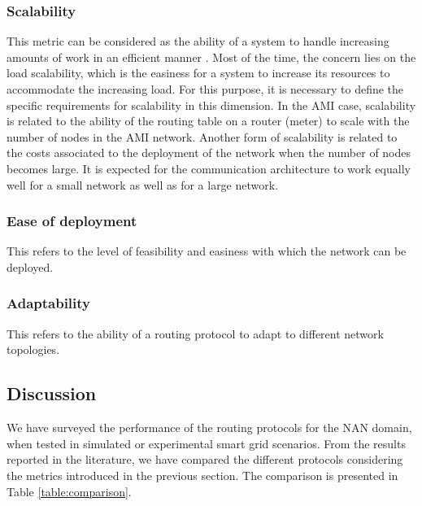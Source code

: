 \documentclass[11pt,draftclsnofoot,onecolumn]{IEEEtran}
\begin{document}
\subsubsection{Scalability}
This metric can be considered as the ability of a system to handle increasing amounts of work in an efficient manner \cite{Zhou2012}. Most of the time, the concern lies on the load scalability, which is the easiness for a system to increase its resources to accommodate the increasing load. For this purpose, it is necessary to define the specific requirements for scalability in this dimension. In the AMI case, scalability is related to the ability of the routing table on a router (meter) to scale with the number of nodes in the AMI network. Another form of scalability is related to the costs associated to the deployment of the network when the number of nodes becomes large. It is expected for the communication architecture to work equally well for a small network as well as for a large network.


\subsubsection{Ease of deployment}
This refers to the level of feasibility and easiness with which the network can be deployed. 


\subsubsection{Adaptability}
This refers to the ability of a routing protocol to adapt to different network topologies. 

\subsection{Discussion}

We have surveyed the performance of the routing protocols for the NAN domain, when tested in simulated or experimental smart grid scenarios. From the results reported in the literature, we have compared the different protocols considering the metrics introduced in the previous section. The comparison is presented in Table \ref{table:comparison}.
\end{document}
